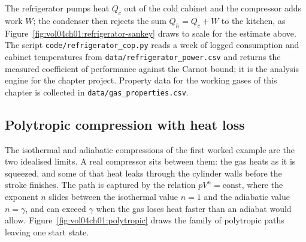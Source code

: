 The refrigerator pumps heat $Q_c$ out of the cold cabinet and the
compressor adds work $W$; the condenser then rejects the sum
$Q_h = Q_c + W$ to the kitchen, as
Figure~\ref{fig:vol04ch01:refrigerator-sankey} draws to scale for the
estimate above. The script \texttt{code/refrigerator\_cop.py} reads a
week of logged consumption and cabinet temperatures from
\texttt{data/refrigerator\_power.csv} and returns the measured
coefficient of performance against the Carnot bound; it is the
analysis engine for the chapter project. Property data for the working
gases of this chapter is collected in \texttt{data/gas\_properties.csv}.



\subsection{Polytropic compression with heat loss}

The isothermal and adiabatic compressions of the first worked example
are the two idealised limits. A real compressor sits between them: the
gas heats as it is squeezed, and some of that heat leaks through the
cylinder walls before the stroke finishes. The path is captured by the
 relation $pV^n = \text{const}$, where the exponent
$n$ slides between the isothermal value $n = 1$ and the adiabatic value
$n = \gamma$, and can exceed $\gamma$ when the gas loses heat faster
than an adiabat would allow. Figure~\ref{fig:vol04ch01:polytropic} draws
the family of polytropic paths leaving one start state.

